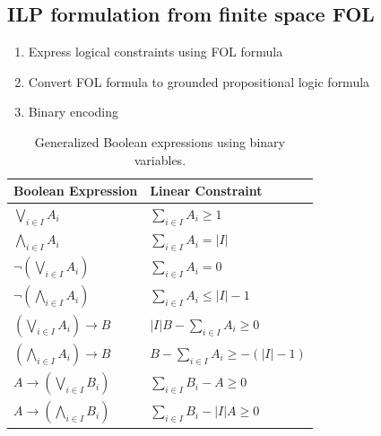 \documentclass[10pt]{article}
\theoremstyle{definition}
\begin{document}
\subsection{ILP formulation from finite space FOL}
\begin{enumerate}
  \item Express logical constraints using FOL formula
  \item Convert FOL formula to grounded propositional logic formula
  \item Binary encoding
\end{enumerate}
\begin{table}[H]
\centering

\begin{tabular}{l l}
\hline
\textbf{Boolean Expression} & \textbf{Linear Constraint} \\
\hline

$\displaystyle \bigvee_{i\in I} A_i$
&
$\displaystyle \sum_{i\in I} A_i \ge 1$
\\[6pt]

$\displaystyle \bigwedge_{i\in I} A_i$
&
$\displaystyle \sum_{i\in I} A_i = |I|$
\\[6pt]

$\displaystyle \neg\left(\bigvee_{i\in I} A_i\right)$
&
$\displaystyle \sum_{i\in I} A_i = 0$
\\[6pt]

$\displaystyle \neg\left(\bigwedge_{i\in I} A_i\right)$
&
$\displaystyle \sum_{i\in I} A_i \le |I|-1$
\\[6pt]

$\displaystyle
\left(\bigvee_{i\in I} A_i\right)\rightarrow B$
&
$\displaystyle
|I|B-\sum_{i\in I}A_i \ge 0$
\\[6pt]

$\displaystyle
\left(\bigwedge_{i\in I} A_i\right)\rightarrow B$
&
$\displaystyle
B-\sum_{i\in I}A_i \ge -( |I|-1)$
\\[6pt]

$\displaystyle
A\rightarrow\left(\bigvee_{i\in I}B_i\right)$
&
$\displaystyle
\sum_{i\in I}B_i-A\ge0$
\\[6pt]

$\displaystyle
A\rightarrow\left(\bigwedge_{i\in I}B_i\right)$
&
$\displaystyle
\sum_{i\in I}B_i-|I|A\ge0$
\\

\hline
\end{tabular}

\caption{Generalized Boolean expressions using binary variables.}
\end{table}
\end{document}
